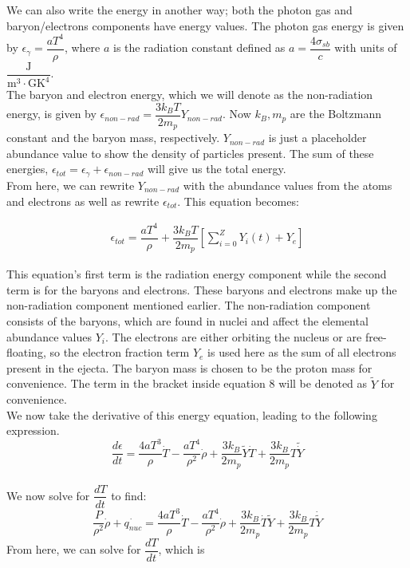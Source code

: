 \documentclass[11pt,a4paper]{article}
\begin{document}
We can also write the energy in another way; both the photon gas and baryon/electrons components have energy values. The photon gas energy is given by $\epsilon_{\gamma} =\dfrac{a T^4}{\rho}$, where $a$ is the radiation constant defined as $a = \dfrac{4 \sigma_{sb}}{c}$ with units of $\mathrm{\dfrac{J}{m^3 \cdot {GK}^4}}$.\\

The baryon and electron energy, which we will denote as the non-radiation energy, is given by $\epsilon_{non-rad} = \dfrac{3 k_B T}{2 m_p} Y_{non-rad}$. Now $k_B, m_p$ are the Boltzmann constant and the baryon mass, respectively. $Y_{non-rad}$ is just a placeholder abundance value to show the density of particles present. The sum of these energies, $\epsilon_{tot} = \epsilon_\gamma + \epsilon_{non-rad}$ will give us the total energy. 
\\

From here, we can rewrite $Y_{non-rad}$ with the abundance values from the atoms and electrons as well as rewrite $\epsilon_{tot}$. This equation becomes:  

\begin{align}
	\epsilon_{tot} = \dfrac{a T^4}{\rho} + \dfrac{3 k_B T}{2 m_p} \left[\sum_{i=0}^{Z} Y_i(t) + Y_e \right] 
\end{align}

This equation's first term is the radiation energy component while the second term is for the baryons and electrons. These baryons and electrons make up the non-radiation component mentioned earlier. The non-radiation component consists of the baryons, which are found in nuclei and affect the elemental abundance values $Y_i$. The electrons are either orbiting the nucleus or are free-floating, so the electron fraction term $Y_e$ is used here as the sum of all electrons present in the ejecta. The baryon mass is chosen to be the proton mass for convenience. The term in the bracket inside equation 8 will be denoted as $\tilde{Y}$ for convenience.\\
We now take the derivative of this energy equation, leading to the following expression. \\

$$ \dfrac{d \epsilon}{dt} = \dfrac{4a T^3}{\rho}\dot{T} - \dfrac{a T^4}{\rho^2} \dot{\rho} + \dfrac{3 k_B}{2 m_p} \tilde{Y} \dot{T} + \dfrac{3 k_B}{2 m_p} T \tilde{\dot{Y}} $$ \\

We now solve for $\dfrac{dT}{dt}$ to find: 
$$ \dfrac{P}{\rho^2} \dot{\rho} + \dot{q_{nuc}} = \dfrac{4a T^3}{\rho} \dot{T} -  \dfrac{aT^4}{\rho^2} \dot{\rho} + \dfrac{3 k_B}{2 m_p} \dot{T} \tilde{Y} + \dfrac{3 k_B}{2 m_p} T \dot{\tilde{Y}} $$ From here, we can solve for $\dfrac{dT}{dt}$, which is 
\end{document}
